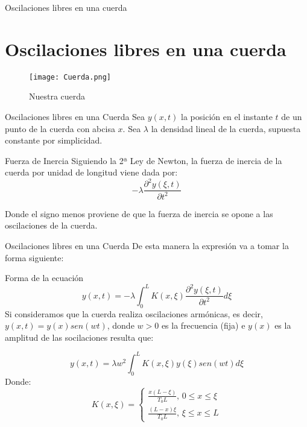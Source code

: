 \documentclass{beamer}
\begin{document}
\begin{frame}{Oscilaciones libres en una cuerda \cite{rahman2007integral}}
    \section{Oscilaciones libres en una cuerda}
    \begin{figure}
        \centering
        \texttt{[image: Cuerda.png]}
        \caption{Nuestra cuerda}
        \label{fig:enter-label}
\end{figure}
    
\end{frame}
\begin{frame}{Oscilaciones libres en una Cuerda}
    Sea $y(x,t)$ la posición en el instante $t$ de un punto de la cuerda con abcisa $x$. Sea $\lambda$ la densidad lineal de la cuerda, supuesta constante por simplicidad.
    \begin{block}{Fuerza de Inercia}
        Siguiendo la 2ª Ley de Newton, la fuerza de inercia de la cuerda por unidad de longitud viene dada por:
        \begin{equation}
            -\lambda\frac{\partial^2y(\xi,t)}{\partial t^2}
        \end{equation}
    \end{block}
    Donde el signo menos proviene de que la fuerza de inercia se opone a las oscilaciones de la cuerda.   
\end{frame}

\begin{frame}{Oscilaciones libres en una Cuerda}
    De esta manera la expresión va a tomar la forma siguiente:
    \begin{block}{Forma de la ecuación}
        \begin{equation}
           y(x,t)= -\lambda \int^L_0 K(x,\xi)\frac{\partial^2y(\xi,t)}{\partial t^2} d\xi
        \end{equation}
        Si consideramos que la cuerda realiza oscilaciones armónicas, es decir, $y(x,t)= y(x)sen(wt)$, donde $w>0$ es la frecuencia (fija) e $y(x)$ es la amplitud de las socilaciones resulta que:

        \begin{equation}
            y(x,t)= \lambda w^2\int^L_0 K(x,\xi)y(\xi)sen(wt) d\xi
            \label{ya casi está}
        \end{equation}
        Donde:
        $$
        K(x, \xi) = \left\{ \begin{array}{c}
        \frac{x(L-\xi)}{T_0 L}, \, 0 \leq x \leq \xi \\
        \frac{(L-x)\xi}{T_0 L}, \, \xi \leq x \leq L      
        \end{array} \right.
        $$
    \end{block}
\end{frame}
\end{document}
